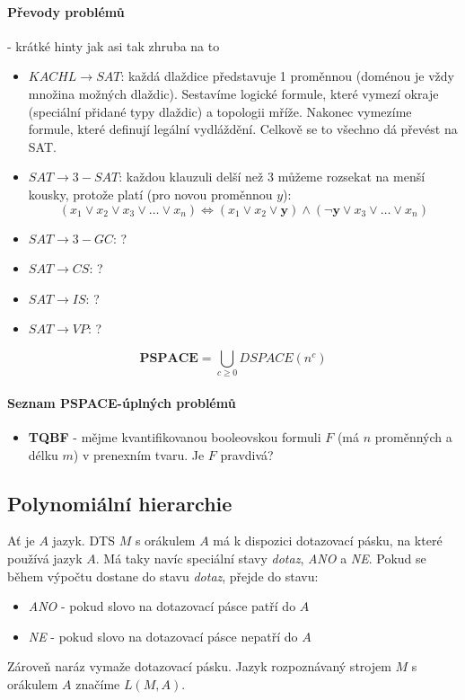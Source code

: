\documentclass[a4paper]{article}      %
\newenvironment{definition}[1][Definice]{\begin{trivlist}
\item[\hskip \labelsep {\bfseries #1}]}{\end{trivlist}}
\begin{document}
\paragraph{Převody problémů} - krátké hinty jak asi tak zhruba na to
\begin{itemize}
\item $KACHL \rightarrow SAT$: každá dlaždice představuje 1 proměnnou (doménou je vždy množina možných dlaždic).
Sestavíme logické formule, které vymezí okraje (speciální přidané typy dlaždic) a topologii mříže. Nakonec vymezíme formule, které definují legální vydláždění. Celkově se to všechno dá převést na SAT.
\item $SAT \rightarrow 3-SAT$: každou klauzuli delší než 3 můžeme rozsekat na menší kousky, protože platí (pro novou proměnnou $y$):
\[
(x_1 \vee x_2 \vee x_3 \vee \ldots \vee x_n) \Leftrightarrow (x_1 \vee x_2 \vee \mathbf{y}) \wedge (\mathbf{\neg y} \vee x_3 \vee \ldots \vee x_n)
\]
\item $SAT \rightarrow 3-GC$: ?
\item $SAT \rightarrow CS$: ?
\item $SAT \rightarrow IS$: ?
\item $SAT \rightarrow VP$: ?
\end{itemize} 

\begin{definition}[Třída PSPACE]
\[
\mathbf{PSPACE} = \bigcup_{c \geq 0} DSPACE(n^{c})
\]
\end{definition}

\paragraph{Seznam PSPACE-úplných problémů}
\begin{itemize}
\item \textbf{TQBF} - mějme kvantifikovanou booleovskou formuli $F$ (má $n$ proměnných a délku $m$) v prenexním tvaru. Je $F$ pravdivá?
\end{itemize}

\subsection{Polynomiální hierarchie}

\begin{definition}[DTS s orákulem]
Ať je $A$ jazyk. DTS $M$ s orákulem $A$ má k dispozici dotazovací pásku, na které používá jazyk $A$.
Má taky navíc speciální stavy \emph{dotaz}, \emph{ANO} a \emph{NE}. Pokud se během výpočtu dostane do stavu \emph{dotaz},
přejde do stavu:
\begin{itemize}
\item \emph{ANO} - pokud slovo na dotazovací pásce patří do $A$
\item \emph{NE} - pokud slovo na dotazovací pásce nepatří do $A$
\end{itemize}
Zároveň naráz vymaže dotazovací pásku. Jazyk rozpoznávaný strojem $M$ s orákulem $A$ značíme $L(M,A)$. 
\end{definition}
\end{document}
